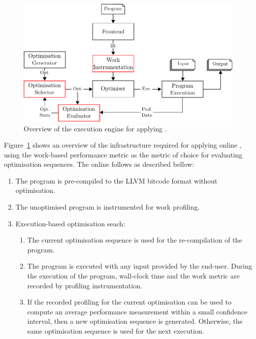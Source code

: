 \begin{figure}[htb]
    \centering
    \includegraphics[width=\linewidth]{figs/infra-diagram}
    \caption{Overview of the execution engine for applying {\itercomp}.}
    \label{fig:infra-diagram}
\end{figure}

Figure~\ref{fig:infra-diagram} shows an overview of the infrastructure required for applying online {\itercomp},
using the work-based performance metric as the metric of choice for evaluating optimisation sequences.
The online {\itercomp} follows as described bellow:
\begin{enumerate}
\item The program is pre-compiled to the LLVM bitcode format without optimisation.
\item The unoptimised program is instrumented for work profiling.
\item Execution-based optimisation seach:
 \begin{enumerate}
   \item The current optimisation sequence is used for the re-compilation of the program.
   \item The program is executed with any input provided by the end-user.
         During the execution of the program, wall-clock time and the work metric are recorded by profiling instrumentation.
   \item If the recorded profiling for the current optimisation can be used to compute an average performance measurement within a small confidence interval,
         then a new optimisation sequence is generated.
         Otherwise, the same optimisation sequence is used for the next execution.
 \end{enumerate}
\end{enumerate}

